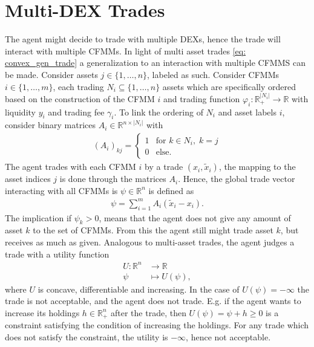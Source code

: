 \section{Multi-DEX Trades}
The agent might decide to trade with multiple DEXs, hence the trade will
interact with multiple CFMMs. In light of multi asset trades
\ref{eq: convex_gen_trade} a generalization to an interaction with multiple CFMMS can
be made. Consider assets $j \in \{1, \ldots,n\}$, labeled as such. Consider
CFMMs $i \in \{1,\ldots,m\}$, each trading $N_i \subseteq \{1,\ldots,n\}  $
assets which are specifically ordered based on the construction of the CFMM
$i$ and trading function $\varphi_i: \mathbb{R}^{|N_i|}_+\to \mathbb{R}$ with
liquidity $y_i$ and trading fee $\gamma_i$. To link the ordering of $N_i$ and
asset labels $i$, consider binary matrices $A_i \in \mathbb{R}^{n\times
|N_i|}$ with
\begin{align}
    (A_i)_{kj} =
    \begin{cases}
        1 & \text{for } k \in N_i, \; k = j \\
        0 & \text{else}.
        \end{cases}
\end{align}
The agent trades with each CFMM $i$ by a trade $(x_i, \tilde{x}_i)$, the
mapping to the asset indices $j$ is done through the matrices $A_i$. Hence,
the global trade vector interacting with all CFMMs is $\psi \in
\mathbb{R}^{n}$ is defined as
\begin{align}
    \psi = \sum_{i=1}^{m} A_i(\tilde{x}_i-x_i).
\end{align}
The implication if $\psi_k > 0$, means that the agent does not give any
amount of asset $k$ to the set of CFMMs. From this the agent still might
trade asset $k$, but receives as much as given. Analogous to multi-asset
trades, the agent judges a trade with a utility function
\begin{align}
    U:\mathbb{R}^{n}&\to\mathbb{R}\\
    \psi &\mapsto U(\psi),
\end{align}
where $U$ is concave, differentiable and increasing. In the case of $U(\psi)
= -\infty$ the trade is not acceptable, and the agent does not trade. E.g. if
the agent wants to increase its holdings $h\in \mathbb{R}_+^{n}$ after the
trade, then $U(\psi) = \psi + h \ge 0$ is a constraint satisfying the
condition of increasing the holdings. For any trade which does not satisfy
the constraint, the utility is $-\infty$, hence not acceptable.

